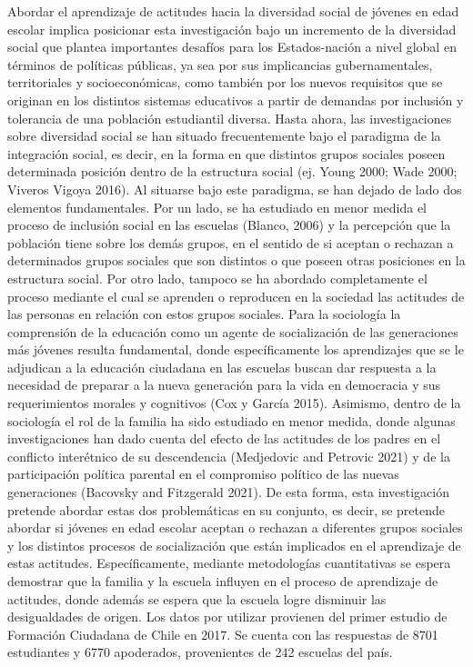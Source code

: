 \documentclass[12pt,twoside]{templates/facsothesis}
\begin{document}
Abordar el aprendizaje de actitudes hacia la diversidad social de jóvenes en edad escolar implica posicionar esta investigación bajo un incremento de la diversidad social que plantea importantes desafíos para los Estados-nación a nivel global en términos de políticas públicas, ya sea por sus implicancias gubernamentales, territoriales y socioeconómicas, como también por los nuevos requisitos que se originan en los distintos sistemas educativos a partir de demandas por inclusión y tolerancia de una población estudiantil diversa. Hasta ahora, las investigaciones sobre diversidad social se han situado frecuentemente bajo el paradigma de la integración social, es decir, en la forma en que distintos grupos sociales poseen determinada posición dentro de la estructura social (ej. Young 2000; Wade 2000; Viveros Vigoya 2016). Al situarse bajo este paradigma, se han dejado de lado dos elementos fundamentales. Por un lado, se ha estudiado en menor medida el proceso de inclusión social en las escuelas (Blanco, 2006) y la percepción que la población tiene sobre los demás grupos, en el sentido de si aceptan o rechazan a determinados grupos sociales que son distintos o que poseen otras posiciones en la estructura social. Por otro lado, tampoco se ha abordado completamente el proceso mediante el cual se aprenden o reproducen en la sociedad las actitudes de las personas en relación con estos grupos sociales. Para la sociología la comprensión de la educación como un agente de socialización de las generaciones más jóvenes resulta fundamental, donde específicamente los aprendizajes que se le adjudican a la educación ciudadana en las escuelas buscan dar respuesta a la necesidad de preparar a la nueva generación para la vida en democracia y sus requerimientos morales y cognitivos (Cox y García 2015). Asimismo, dentro de la sociología el rol de la familia ha sido estudiado en menor medida, donde algunas investigaciones han dado cuenta del efecto de las actitudes de los padres en el conflicto interétnico de su descendencia (Medjedovic and Petrovic 2021) y de la participación política parental en el compromiso político de las nuevas generaciones (Bacovsky and Fitzgerald 2021). De esta forma, esta investigación pretende abordar estas dos problemáticas en su conjunto, es decir, se pretende abordar si jóvenes en edad escolar aceptan o rechazan a diferentes grupos sociales y los distintos procesos de socialización que están implicados en el aprendizaje de estas actitudes. Específicamente, mediante metodologías cuantitativas se espera demostrar que la familia y la escuela influyen en el proceso de aprendizaje de actitudes, donde además se espera que la escuela logre disminuir las desigualdades de origen. Los datos por utilizar provienen del primer estudio de Formación Ciudadana de Chile en 2017. Se cuenta con las respuestas de 8701 estudiantes y 6770 apoderados, provenientes de 242 escuelas del país.
\end{document}
